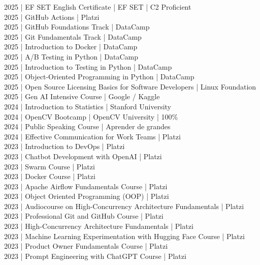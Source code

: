 {
2025 | EF SET English Certificate | EF SET | C2 Proficient \\
2025 | GitHub Actions | Platzi \\
2025 | GitHub Foundations Track | DataCamp \\
2025 | Git Fundamentals Track | DataCamp \\
2025 | Introduction to Docker | DataCamp \\
2025 | A/B Testing in Python | DataCamp \\
2025 | Introduction to Testing in Python  | DataCamp \\
2025 | Object-Oriented Programming in Python | DataCamp \\
2025 | Open Source Licensing Basics for Software Developers | Linux Foundation \\
2025 | Gen AI Intensive Course  | Google / Kaggle \\
2024 | Introduction to Statistics | Stanford University \\
2024 | OpenCV Bootcamp | OpenCV University | 100\% \\
2024 | Public Speaking Course | Aprender de grandes \\
2024 | Effective Communication for Work Teams | Platzi \\
2023 | Introduction to DevOps | Platzi \\
2023 | Chatbot Development with OpenAI | Platzi \\
2023 | Swarm Course | Platzi \\
2023 | Docker Course | Platzi \\
2023 | Apache Airflow Fundamentals Course | Platzi \\
2023 | Object Oriented Programming (OOP) | Platzi \\
2023 | Audiocourse on High-Concurrency Architecture Fundamentals | Platzi \\
2023 | Professional Git and GitHub Course | Platzi \\
2023 | High-Concurrency Architecture Fundamentals | Platzi \\
2023 | Machine Learning Experimentation with Hugging Face Course | Platzi \\
2023 | Product Owner Fundamentals Course | Platzi \\
2023 | Prompt Engineering with ChatGPT Course | Platzi \\
}
